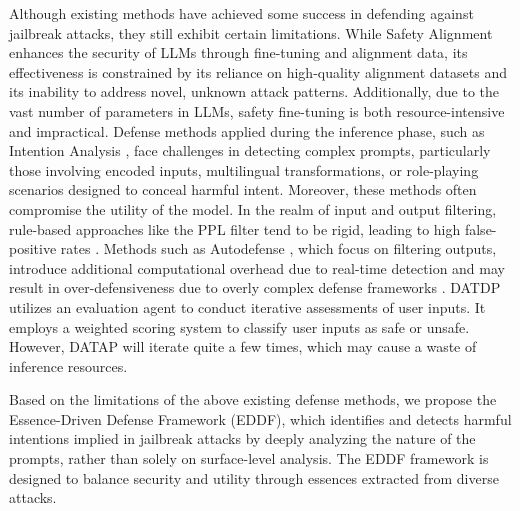Although existing methods have achieved some success in defending against jailbreak attacks, they still exhibit certain limitations. While Safety Alignment enhances the security of LLMs through fine-tuning and alignment data, its effectiveness is constrained by its reliance on high-quality alignment datasets \citep{ji2024aligner} and its inability to address novel, unknown attack patterns. Additionally, due to the vast number of parameters in LLMs, safety fine-tuning is both resource-intensive and impractical. Defense methods applied during the inference phase, such as Intention Analysis \citep{zhang2024intention}, face challenges in detecting complex prompts, particularly those involving encoded inputs, multilingual transformations, or role-playing scenarios designed to conceal harmful intent. Moreover, these methods often compromise the utility of the model. In the realm of input and output filtering, rule-based approaches like the PPL filter \citep{alon2023detecting} tend to be rigid, leading to high false-positive rates \citep{wei2023jailbreak}. Methods such as Autodefense \citep{zeng2024autodefense}, which focus on filtering outputs, introduce additional computational overhead due to real-time detection and may result in over-defensiveness due to overly complex defense frameworks \citep{varshney2023art}. DATDP \citep{armstrong2025defense} utilizes an evaluation agent to conduct iterative assessments of user inputs. It employs a weighted scoring system to classify user inputs as safe or unsafe. However, DATAP will iterate quite a few times, which may cause a waste of inference resources.

Based on the limitations of the above existing defense methods, we propose the Essence-Driven Defense Framework (EDDF), which identifies and detects harmful intentions implied in jailbreak attacks by deeply analyzing the nature of the prompts, rather than solely on surface-level analysis. The EDDF framework is designed to balance security and utility through essences extracted from diverse attacks.




